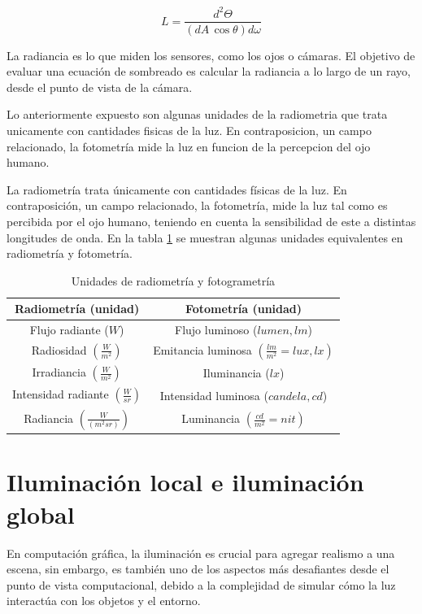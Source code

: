 $$
L = \frac{d^2\Theta}{(dA\,\cos\theta)d\omega}
$$

La radiancia es lo que miden los sensores, como los ojos o cámaras.
El objetivo de evaluar una ecuación de sombreado es calcular la radiancia a lo largo de un rayo, desde el punto de vista de la cámara.

Lo anteriormente expuesto son algunas unidades de la radiometria que trata unicamente con cantidades fisicas de la luz.
En contraposicion, un campo relacionado, la fotometría mide la luz en funcion de la percepcion del ojo humano.

La radiometría trata únicamente con cantidades físicas de la luz.
En contraposición, un campo relacionado, la fotometría, mide la luz tal como es percibida por el ojo humano, teniendo en cuenta la sensibilidad de este a distintas longitudes de onda.
En la tabla \ref{table:light_units} se muestran algunas unidades equivalentes en radiometría y fotometría.

\begin{table}
\centering
\begin{tabular}{|c|c|}
    \hline
    \textbf{Radiometría (unidad)} & \textbf{Fotometría (unidad)} \\
    \hline
    Flujo radiante ($W$) & Flujo luminoso ($lumen, lm$) \\
    \hline
    Radiosidad $\left(\frac{W}{m^2}\right)$ & Emitancia luminosa $\left(\frac{lm}{m^2} = lux, lx\right)$ \\
    \hline
    Irradiancia $\left(\frac{W}{m^2}\right)$ & Iluminancia ($lx$) \\
    \hline
    Intensidad radiante $\left(\frac{W}{sr}\right)$ & Intensidad luminosa ($candela, cd$) \\
    \hline
    Radiancia $\left(\frac{W}{(m^2sr)}\right)$ & Luminancia $\left(\frac{cd}{m^2} = nit\right)$ \\
    \hline
\end{tabular}
\caption{Unidades de radiometría y fotogrametría}
\label{table:light_units}
\end{table}

\section{Iluminación local e iluminación global}\label{sec:local_vs_global}

En computación gráfica, la iluminación es crucial para agregar realismo a una escena, sin embargo, es también uno de los aspectos más desafiantes desde el punto de vista computacional, debido a la complejidad de simular cómo la luz interactúa con los objetos y el entorno.

